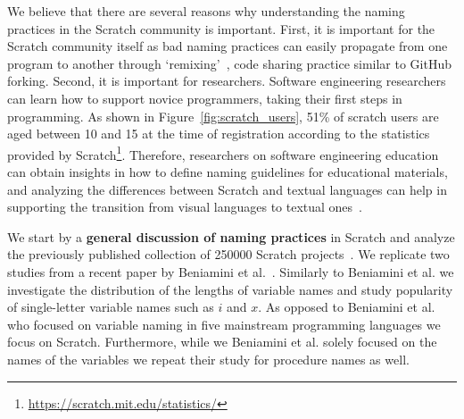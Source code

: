\documentclass[conference]{IEEEtran}
\newcommand{\todo}[1]{ \textbf{#1} }
\begin{document}

We believe that there are several reasons why understanding the naming practices in the Scratch community is important.
First, it is important for the Scratch community itself as bad naming practices can easily propagate from one program to another through `remixing'~\cite{Hill:Monroy-Hernandez,Davis:Kafai:Vasudevan:Lee}, code sharing practice similar to GitHub forking.
Second, it is important for researchers. Software engineering researchers can learn how to support novice programmers, taking their first steps in programming. As shown in Figure~\ref{fig:scratch_users}, 51\% of scratch users are aged between 10 and 15 at the time of registration according to the statistics provided by Scratch\footnote{\url{https://scratch.mit.edu/statistics/}}. Therefore, researchers on software engineering education can obtain insights in how to define naming guidelines for educational materials, and analyzing the differences between Scratch and textual languages can help in supporting the transition from visual languages to textual ones~\cite{Dann,Matsuzawa}. 

We start by a \textbf{general discussion of naming practices} in Scratch and analyze the previously published collection of 250000 Scratch projects~\cite{Aivaloglou2016HowKC}. 
We replicate two studies from a recent paper by Beniamini et al.~\cite{Beniamini}.
Similarly to Beniamini et al. we investigate the distribution of the lengths of variable names and study popularity of single-letter variable names such as $i$ and $x$.
As opposed to Beniamini et al. who focused on variable naming in five mainstream programming languages we focus on Scratch.
Furthermore, while we Beniamini et al. solely focused on the names of the variables we repeat their study for procedure names as well.
\end{document}
